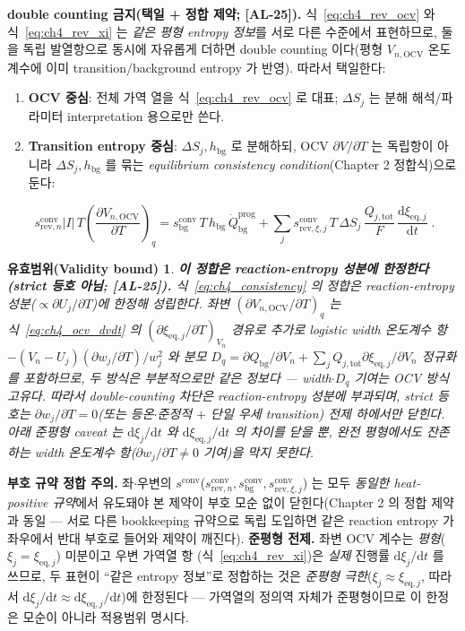 \documentclass[11pt,a4paper]{article}
\newtheorem*{boundbox}{유효범위(Validity bound)}
\newcommand{\dd}{\mathrm{d}}
\newcommand{\eq}{\mathrm{eq}}
\newcommand{\bg}{\mathrm{bg}}
\newcommand{\OCV}{\mathrm{OCV}}
\newcommand{\tot}{\mathrm{tot}}
\newcommand{\rev}{\mathrm{rev}}
\newcommand{\conv}{\mathrm{conv}}
\newcommand{\prog}{\mathrm{prog}}
\newcommand{\AL}[1]{\textsf{[AL-#1]}}
\begin{document}
\textbf{double counting 금지(택일 + 정합 제약; \AL{25}).} 식~\eqref{eq:ch4_rev_ocv} 와 식~\eqref{eq:ch4_rev_xi}
는 \emph{같은 평형 entropy 정보}를 서로 다른 수준에서 표현하므로, 둘을 독립 발열항으로 동시에 자유롭게 더하면
double counting 이다(평형 $V_{n,\OCV}$ 온도계수에 이미 transition/background entropy 가 반영). 따라서 택일한다:
\begin{enumerate}[label=\Alph*),leftmargin=2.0em]
\item \textbf{OCV 중심}: 전체 가역 열을 식~\eqref{eq:ch4_rev_ocv} 로 대표; $\Delta S_j$ 는 분해 해석/파라미터
  interpretation 용으로만 쓴다.
\item \textbf{Transition entropy 중심}: $\Delta S_j,h_\bg$ 로 분해하되, OCV $\partial V/\partial T$ 는 독립항이
  아니라 $\Delta S_j,h_\bg$ 를 묶는 \emph{equilibrium consistency condition}(Chapter 2 정합식)으로 둔다:
\end{enumerate}
\begin{equation}
\boxed{\;s_{\rev,n}^{\conv}|I|\,T\left(\frac{\partial V_{n,\OCV}}{\partial T}\right)_q
=s_\bg^{\conv}\,T\,h_\bg\,\dot Q_\bg^{\prog}
+\sum_j s_{\rev,\xi,j}^{\conv}\,T\,\Delta S_j\,\frac{Q_{j,\tot}}{F}\,\frac{\dd\xi_{\eq,j}}{\dd t}\;.}
\label{eq:ch4_consistency}
\end{equation}
\begin{boundbox}
\textbf{이 정합은 reaction-entropy 성분에 한정한다(strict 등호 아님; \AL{25}).} 식~\eqref{eq:ch4_consistency} 의
정합은 \emph{reaction-entropy 성분($\propto\partial U_j/\partial T$)에 한정}해 성립한다. 좌변
$(\partial V_{n,\OCV}/\partial T)_q$ 는 식~\eqref{eq:ch4_ocv_dvdt} 의 $(\partial\xi_{\eq,j}/\partial T)_{V_n}$ 경유로
추가로 logistic width 온도계수 항 $-(V_n-U_j)(\partial w_j/\partial T)/w_j^2$ 와 분모 $D_q=\partial Q_\bg/\partial V_n
+\sum_j Q_{j,\tot}\partial\xi_{\eq,j}/\partial V_n$ 정규화를 포함하므로, 두 방식은 \emph{부분적으로만} 같은
정보다 — width$\cdot D_q$ 기여는 OCV 방식 고유다. 따라서 double-counting 차단은 reaction-entropy 성분에
부과되며, strict 등호는 $\partial w_j/\partial T=0$(또는 등온$\cdot$준정적 $+$ 단일 우세 transition) 전제 하에서만
닫힌다. 아래 준평형 caveat 는 $\dd\xi_j/\dd t$ 와 $\dd\xi_{\eq,j}/\dd t$ 의 차이를 닫을 뿐, 완전 평형에서도
잔존하는 width 온도계수 항($\partial w_j/\partial T\ne0$ 기여)을 막지 못한다.
\end{boundbox}
\textbf{부호 규약 정합 주의.} 좌$\cdot$우변의 $s^{\conv}$($s_{\rev,n}^{\conv},s_\bg^{\conv},s_{\rev,\xi,j}^{\conv}$)
는 모두 \emph{동일한 heat-positive 규약}에서 유도돼야 본 제약이 부호 모순 없이 닫힌다(Chapter 2 의 정합 제약과
동일 — 서로 다른 bookkeeping 규약으로 독립 도입하면 같은 reaction entropy 가 좌우에서 반대 부호로 들어와 제약이
깨진다). \textbf{준평형 전제.} 좌변 OCV 계수는 \emph{평형}($\xi_j=\xi_{\eq,j}$) 미분이고 우변 가역열 항
(식~\eqref{eq:ch4_rev_xi})은 \emph{실제} 진행률 $\dd\xi_j/\dd t$ 를 쓰므로, 두 표현이 ``같은 entropy 정보''로
정합하는 것은 \emph{준평형 극한}($\xi_j\approx\xi_{\eq,j}$, 따라서 $\dd\xi_j/\dd t\approx\dd\xi_{\eq,j}/\dd t$)에
한정된다 — 가역열의 정의역 자체가 준평형이므로 이 한정은 모순이 아니라 적용범위 명시다.
\end{document}
